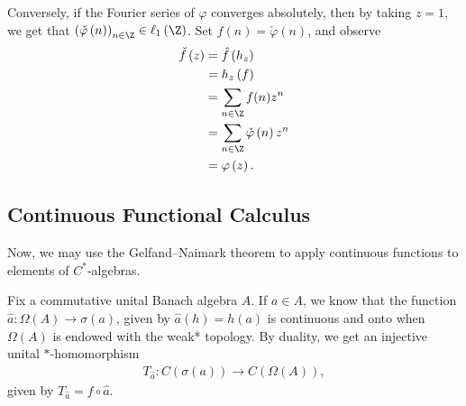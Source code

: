 \documentclass[10pt]{mypackage}
\begin{document}
\begin{example}
  Conversely, if the Fourier series of $\varphi$ converges absolutely, then by taking $z = 1$, we get that $\left(\check\varphi\left(n\right)\right)_{n\in\Z}\in\ell_1\left(\Z\right)$. Set $f(n) = \check\varphi\left(n\right)$, and observe
  \begin{align*}
    \check f\left(z\right) &= \hat f\left(h_z\right)\\
                         &= h_z\left(f\right)\\
                         &= \sum_{n\in \Z}f(n)z^n\\
                         &= \sum_{n\in\Z}\check\varphi\left(n\right)z^n\\
                         &= \varphi\left(z\right).
  \end{align*}
\end{example}
\subsection{Continuous Functional Calculus}%
Now, we may use the Gelfand--Naimark theorem to apply continuous functions to elements of $C^{\ast}$-algebras.\newline

Fix a commutative unital Banach algebra $A$. If $a\in A$, we know that the function $\hat{a}\colon \Omega\left(A\right)\rightarrow \sigma\left(a\right)$, given by $\hat{a}\left(h\right) = h\left(a\right)$ is continuous and onto when $\Omega\left(A\right)$ is endowed with the weak* topology. By duality, we get an injective unital $\ast$-homomorphism
\begin{align*}
  T_{\hat{a}}\colon C\left(\sigma\left(a\right)\right) \rightarrow C\left(\Omega\left(A\right)\right),
\end{align*}
given by $T_{\hat{a}} = f\circ \hat{a}$.\newline
\end{document}
